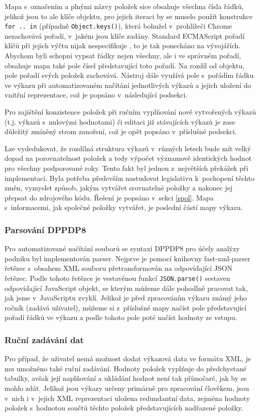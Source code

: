 Mapa s~označením a plnými názvy položek sice obsahuje všechna čísla řádků, jelikož jsou to ale klíče objektu, pro jejich iteraci by se muselo použít konstrukce \texttt{for .. in} (případně \texttt{Object.keys()}), která bohužel v~prohlížeči Chrome nezachovává pořadí, v~jakém jsou klíče zadány. Standard ECMAScript pořadí klíčů při jejich výčtu nijak nespecifikuje \cite{proporder}, to je tak ponecháno na vývojářích. Abychom byli schopni vypsat řádky nejen všechny, ale i ve správném pořadí, obsahuje mapa také pole čísel představující toto pořadí. Na rozdíl od objektu, pole pořadí svých položek zachovává. Nástroj dále využívá pole s~pořádím řádku ve výkazu při automatizovaném načítání jednotlivých výkazů a jejich uložení do vnitřní reprezentace, což je popsáno v~následující podsekci. 

Pro zajištění konzistence položek při ručním vyplňování nově vytvořených výkazů (t.j. výkazů s~nulovými hodnotami) či editaci již stávajících výkazů je zase důležitý zmíněný strom zanoření, což je opět popsáno v~příslušné podsekci.

Lze vydedukovat, že rozdílná struktura výkazů v~různých letech bude mít velký dopad na porovnatelnost položek a tedy výpočet významově identických hodnot pro všechny podporované roky. Tento fakt byl jednou z~největších překážek při implementaci. Byla potřeba především nastudovat legislativu k~pochopení těchto změn, vymyslet způsob, jakým vytvářet srovnatelné položky a nakonec jej přepsat do zdrojového kódu. Řešení je popsáno v~sekci \ref{spol}. Mapa s~informacemi, jak společné položky vytvářet, je poslední částí mapy výkazu.


\subsubsection{Parsování DPPDP8}
Pro automatizované načítání souborů se syntaxí DPPDP8 pro účely analýzy podniku byl implementován parser. Nejprve je pomocí knihovny fast-xml-parser řetězec s~obsahem XML souboru přetransformován na odpovídající JSON řetězec. Podle tohoto řetězce je vestavěnou funkcí \texttt{JSON.parse()} sestaven odpovídající JavaScript objekt, se kterým můžeme dále pohodlně pracovat tak, jak jsme v~JavaScriptu zvyklí. Jelikož je před zpracováním výkazu známý jeho ročník (zadává uživatel), můžeme si z~příslušné mapy načíst pole představující pořadí řádků ve výkazu a podle tohoto pole poté načíst hodnoty ze vstupu.


\subsubsection{Ruční zadávání dat}
Pro případ, že uživatel nemá možnost dodat výkazová data ve formátu XML, je mu umožněno také ruční zadávání. Hodnoty položek vyplňuje do předchystané tabulky, avšak její naplňování a ukládání hodnot není tak přímočaré, jak by se mohlo zdát. Jelikož jsou výkazy určeny primárně pro zpracování člověkem, jsou v~nich i v~jejich XML reprezentaci uložena redundantní data, zejména hodnoty položek s~hodnotou součtů těchto položek představujících nadřazené položky. 

